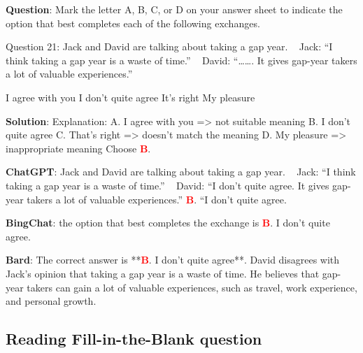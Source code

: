 \documentclass[11pt]{article}
\begin{document}
\begin{mdframed}[linewidth=1pt,linecolor=red] \textbf{Question}: Mark the letter A, B, C, or D on your answer sheet to indicate the option that best completes each of the following exchanges.
	
	Question 21: Jack and David are talking about taking a gap year.
	~  Jack: “I think taking a gap year is a waste of time.”
	~  David: “……. It gives gap-year takers a lot of valuable experiences.”
	
	
	\begin{choices}
		\choice I agree with you 	
		\choice I don’t quite agree   	
		\choice It’s right     		
		\choice My pleasure
	\end{choices}
	
	\textbf{Solution}: 
	Explanation:  A. I agree with you => not suitable meaning
	B. I don't quite agree
	C. That's right => doesn't match the meaning
	D. My pleasure => inappropriate meaning
	Choose \textcolor{red}{\textbf{B}}. 
	
	\textbf{ChatGPT}: Jack and David are talking about taking a gap year. ~ Jack: “I think taking a gap year is a waste of time.” ~ David: “I don’t quite agree. It gives gap-year takers a lot of valuable experiences.” \textcolor{red}{\textbf{B}}. “I don’t quite agree.
	
	\textbf{BingChat}: the option that best completes the exchange is \textcolor{red}{\textbf{B}}. I don’t quite agree. 
	
	\textbf{Bard}: 
	The correct answer is **\textcolor{red}{\textbf{B}}. I don’t quite agree**.
	David disagrees with Jack's opinion that taking a gap year is a waste of time. He believes that gap-year takers can gain a lot of valuable experiences, such as travel, work experience, and personal growth.
	
	
\end{mdframed}

\subsection{Reading Fill-in-the-Blank question}
\end{document}
